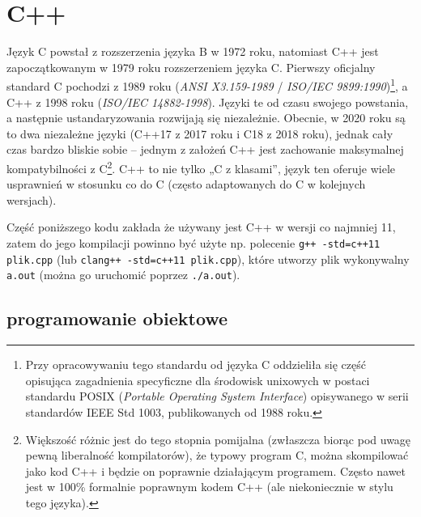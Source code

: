 \documentclass{pdfBooklets}
\begin{document}
\section{C++}

Język C powstał z rozszerzenia języka B w 1972 roku, natomiast C++ jest zapoczątkowanym w 1979 roku rozszerzeniem języka C.
Pierwszy oficjalny standard C pochodzi z 1989 roku (\textit{ANSI X3.159-1989} / \textit{ISO/IEC 9899:1990})\footnote{Przy opracowywaniu tego standardu od języka C oddzieliła się część opisująca zagadnienia specyficzne dla środowisk unixowych w postaci standardu POSIX (\textit{Portable Operating System Interface}) opisywanego w serii standardów IEEE Std 1003, publikowanych od 1988 roku.}, a C++ z 1998 roku (\textit{ISO/IEC 14882-1998}).
Języki te od czasu swojego powstania, a następnie ustandaryzowania rozwijają się niezależnie.
Obecnie, w 2020 roku są to dwa niezależne języki (C++17 z 2017 roku i C18 z 2018 roku), jednak cały czas bardzo bliskie sobie – jednym z założeń C++ jest zachowanie maksymalnej kompatybilności z C\footnote{
	Większość różnic jest do tego stopnia pomijalna (zwłaszcza biorąc pod uwagę pewną liberalność kompilatorów), że typowy program C, można skompilować jako kod C++ i będzie on poprawnie działającym programem.
	Często nawet jest w 100\% formalnie poprawnym kodem C++ (ale niekoniecznie w stylu tego języka).
}.
C++ to nie tylko „C z klasami”, język ten oferuje wiele usprawnień w stosunku co do C (często adaptowanych do C w kolejnych wersjach).

Część poniższego kodu zakłada że używany jest C++ w wersji co najmniej 11, zatem do jego kompilacji powinno być użyte np. polecenie \Verb#g++ -std=c++11 plik.cpp# (lub \Verb#clang++ -std=c++11 plik.cpp#), które utworzy plik wykonywalny \Verb#a.out# (można go uruchomić poprzez \Verb#./a.out#).

\subsection{programowanie obiektowe}
\end{document}
